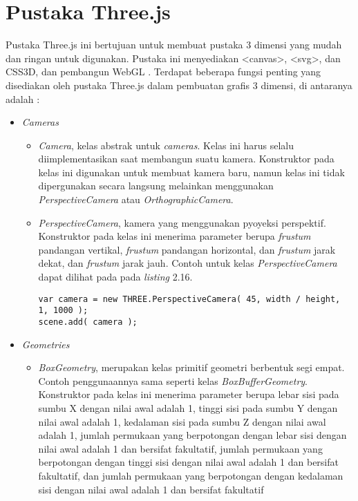 \section{Pustaka Three.js}
\label{sec:latex}
Pustaka Three.js ini bertujuan untuk membuat pustaka 3 dimensi yang mudah dan ringan untuk digunakan. Pustaka ini menyediakan <canvas>, <svg>, dan CSS3D, dan pembangun WebGL \cite{githubthreejs}.
Terdapat beberapa fungsi penting yang disediakan oleh pustaka Three.js dalam pembuatan grafis 3 dimensi, di antaranya adalah \cite{threejs}:
\begin{itemize}

\item \textit{Cameras}

	\begin{itemize}
	\item {\it Camera}, kelas abstrak untuk {\it cameras}. Kelas ini harus selalu diimplementasikan saat membangun suatu kamera. Konstruktor pada kelas ini digunakan untuk membuat kamera baru, namun kelas ini tidak dipergunakan secara langsung melainkan menggunakan {\it PerspectiveCamera} atau {\it OrthographicCamera}.
	
	\item {\it PerspectiveCamera}, kamera yang menggunakan pyoyeksi perspektif. Konstruktor pada kelas ini menerima parameter berupa {\it frustum} pandangan vertikal, {\it frustum} pandangan horizontal, dan {\it frustum} jarak dekat, dan {\it frustum} jarak jauh. Contoh untuk kelas {\it PerspectiveCamera} dapat dilihat pada pada {\it listing} 2.16.
\begin{lstlisting}[caption={Contoh instansiasi kelas {\it PerspectiveCamera}},captionpos=b]
var camera = new THREE.PerspectiveCamera( 45, width / height, 
1, 1000 );
scene.add( camera );
\end{lstlisting}
	\end{itemize}

\item \textit{Geometries}
	\begin{itemize}
	\item {\it BoxGeometry}, merupakan kelas primitif geometri berbentuk segi empat. Contoh penggunaannya sama seperti kelas {\it BoxBufferGeometry}. Konstruktor pada kelas ini menerima parameter berupa lebar sisi pada sumbu X dengan nilai awal adalah 1, tinggi sisi pada sumbu Y dengan nilai awal adalah 1, kedalaman sisi pada sumbu Z dengan nilai awal adalah 1, jumlah permukaan yang berpotongan dengan lebar sisi dengan nilai awal adalah 1 dan bersifat fakultatif,  jumlah permukaan yang berpotongan dengan tinggi sisi dengan nilai awal adalah 1 dan bersifat fakultatif,  dan jumlah permukaan yang berpotongan dengan kedalaman sisi dengan nilai awal adalah 1 dan bersifat fakultatif
	\end{itemize}
	

\end{itemize}
